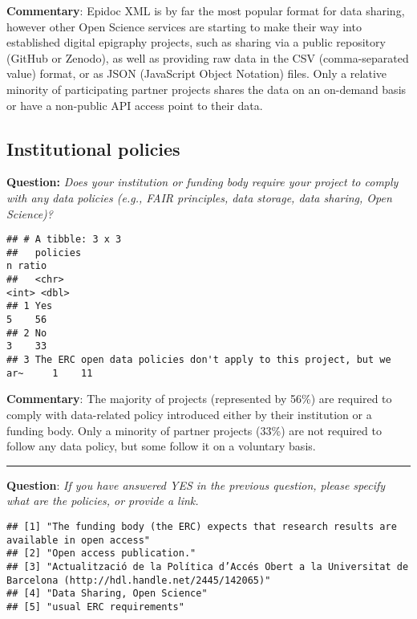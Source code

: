 \documentclass[
]{article}
\begin{document}
\textbf{Commentary}: Epidoc XML is by far the most popular format for
data sharing, however other Open Science services are starting to make
their way into established digital epigraphy projects, such as sharing
via a public repository (GitHub or Zenodo), as well as providing raw
data in the CSV (comma-separated value) format, or as JSON (JavaScript
Object Notation) files. Only a relative minority of participating
partner projects shares the data on an on-demand basis or have a
non-public API access point to their data.

\hypertarget{institutional-policies}{%
\subsection{Institutional policies}\label{institutional-policies}}

\textbf{Question:} \emph{Does your institution or funding body require
your project to comply with any data policies (e.g., FAIR principles,
data storage, data sharing, Open Science)?}

\begin{verbatim}
## # A tibble: 3 x 3
##   policies                                                               n ratio
##   <chr>                                                              <int> <dbl>
## 1 Yes                                                                    5    56
## 2 No                                                                     3    33
## 3 The ERC open data policies don't apply to this project, but we ar~     1    11
\end{verbatim}

\textbf{Commentary}: The majority of projects (represented by 56\%) are
required to comply with data-related policy introduced either by their
institution or a funding body. Only a minority of partner projects
(33\%) are not required to follow any data policy, but some follow it on
a voluntary basis.

\begin{center}\rule{0.5\linewidth}{0.5pt}\end{center}

\textbf{Question}: \emph{If you have answered YES in the previous
question, please specify what are the policies, or provide a link.}

\begin{verbatim}
## [1] "The funding body (the ERC) expects that research results are available in open access"                       
## [2] "Open access publication."                                                                                    
## [3] "Actualització de la Política d’Accés Obert a la Universitat de Barcelona (http://hdl.handle.net/2445/142065)"
## [4] "Data Sharing, Open Science"                                                                                  
## [5] "usual ERC requirements"
\end{verbatim}
\end{document}
